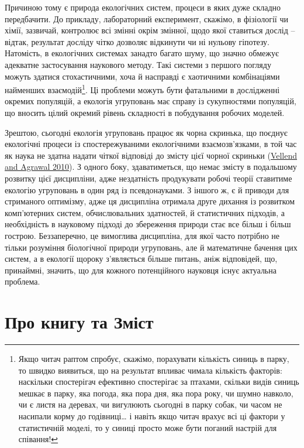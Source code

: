 \documentclass[
  11pt,
]{book}
\begin{document}
Причиною тому є природа екологічних систем, процеси в яких дуже складно передбачити. До прикладу, лабораторний експеримент, скажімо, в фізіології чи хімії, зазвичай, контролює всі змінні окрім змінної, щодо якої ставиться дослід -- відтак, результат досліду чітко дозволяє відкинути чи ні нульову гіпотезу. Натомість, в екологічних системах занадто багато шуму, що значно обмежує адекватне застосування наукового методу. Такі системи з першого погляду можуть здатися стохастичними, хоча й насправді є хаотичними комбінаціями найменших взаємодій\footnote{Якщо читач раптом спробує, скажімо, порахувати кількість синиць в парку, то швидко виявиться, що на результат впливає чимала кількість факторів: наскільки спостерігач ефективно спостерігає за птахами, скільки видів синиць мешкає в парку, яка погода, яка пора дня, яка пора року, чи шумно навколо, чи є листя на деревах, чи вигулюють сьогодні в парку собак, чи часом не насипали корму до годівниці\ldots{} і навіть якщо читач врахує всі ці фактори у статистичній моделі, то у синиці просто може бути поганий настрій для співання!}. Ці проблеми можуть бути фатальними в дослідженні окремих популяцій, а екологія угруповань має справу із сукупностями популяцій, що вносить цілий окремий рівень складності в побудування робочих моделей.

Зрештою, сьогодні екологія угруповань працює як чорна скринька, що поєднує екологічні процеси із спостережуваними екологічними взаємозв'язками, в той час як наука не здатна надати чіткої відповіді до змісту цієї чорної скриньки (\href{https://doi.org/10.1086/652373}{Vellend and Agrawal 2010}). З одного боку, здаватиметься, що немає змісту в подальшому розвитку цієї дисципліни, адже нездатність продукувати робочі теорії ставитиме екологію угруповань в один ряд із псевдонауками. З іншого ж, є й приводи для стриманого оптимізму, адже ця дисципліна отримала друге дихання із розвитком комп'ютерних систем, обчислювальних здатностей, й статистичних підходів, а необхідність в науковому підході до збереження природи стає все більш і більш гострою. Беззаперечно, це вимоглива дисципліна, для якої часто потрібно не тільки розуміння біологічної природи угруповань, але й математичне бачення цих систем, а в екології щороку з'являється більше питань, аніж відповідей, що, принаймні, значить, що для кожного потенційного науковця існує актуальна проблема.

\chapter{Про книгу та Зміст}\label{about-book}
\end{document}

